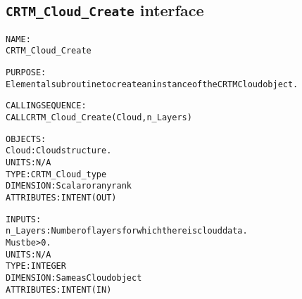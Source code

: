 \subsection{\texttt{CRTM\_Cloud\_Create} interface}
  \label{sec:CRTM_Cloud_Create_interface}
  \begin{alltt}
 
  NAME:
        CRTM_Cloud_Create
  
  PURPOSE:
        Elemental subroutine to create an instance of the CRTM Cloud object.
 
  CALLING SEQUENCE:
        CALL CRTM_Cloud_Create( Cloud, n_Layers )
 
  OBJECTS:
        Cloud:        Cloud structure.
                      UNITS:      N/A
                      TYPE:       CRTM_Cloud_type
                      DIMENSION:  Scalar or any rank
                      ATTRIBUTES: INTENT(OUT)
 
  INPUTS:
        n_Layers:     Number of layers for which there is cloud data.
                      Must be > 0.
                      UNITS:      N/A
                      TYPE:       INTEGER
                      DIMENSION:  Same as Cloud object
                      ATTRIBUTES: INTENT(IN)
 
  \end{alltt}

